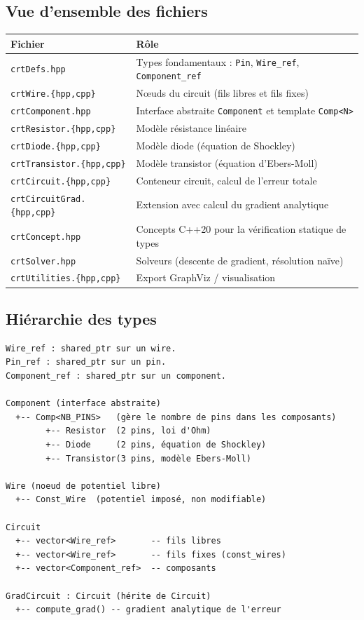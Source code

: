 \documentclass[12pt,a4paper]{article}
\begin{document}
\subsection{Vue d'ensemble des fichiers}

\begin{center}
\begin{tabular}{lp{9cm}}
  \toprule
  \textbf{Fichier} & \textbf{Rôle} \\
  \midrule
  \texttt{crtDefs.hpp}       & Types fondamentaux : \texttt{Pin}, \texttt{Wire\_ref}, \texttt{Component\_ref} \\
  \texttt{crtWire.\{hpp,cpp\}}       & Nœuds du circuit (fils libres et fils fixes) \\
  \texttt{crtComponent.hpp}  & Interface abstraite \texttt{Component} et template \texttt{Comp<N>} \\
  \texttt{crtResistor.\{hpp,cpp\}}   & Modèle résistance linéaire \\
  \texttt{crtDiode.\{hpp,cpp\}}      & Modèle diode (équation de Shockley) \\
  \texttt{crtTransistor.\{hpp,cpp\}} & Modèle transistor (équation d'Ebers-Moll) \\
  \texttt{crtCircuit.\{hpp,cpp\}}    & Conteneur circuit, calcul de l'erreur totale \\
  \texttt{crtCircuitGrad.\{hpp,cpp\}}& Extension avec calcul du gradient analytique \\
  \texttt{crtConcept.hpp}    & Concepts C++20 pour la vérification statique de types \\
  \texttt{crtSolver.hpp}     & Solveurs (descente de gradient, résolution naïve) \\
  \texttt{crtUtilities.\{hpp,cpp\}}  & Export GraphViz / visualisation \\
  \bottomrule
\end{tabular}
\end{center}

\subsection{Hiérarchie des types}

\begin{verbatim}
Wire_ref : shared_ptr sur un wire.
Pin_ref : shared_ptr sur un pin.
Component_ref : shared_ptr sur un component.

Component (interface abstraite)
  +-- Comp<NB_PINS>   (gère le nombre de pins dans les composants)
        +-- Resistor  (2 pins, loi d'Ohm)
        +-- Diode     (2 pins, équation de Shockley)
        +-- Transistor(3 pins, modèle Ebers-Moll)

Wire (noeud de potentiel libre)
  +-- Const_Wire  (potentiel imposé, non modifiable)

Circuit
  +-- vector<Wire_ref>       -- fils libres
  +-- vector<Wire_ref>       -- fils fixes (const_wires)
  +-- vector<Component_ref>  -- composants

GradCircuit : Circuit (hérite de Circuit)
  +-- compute_grad() -- gradient analytique de l'erreur
\end{verbatim}
\end{document}
